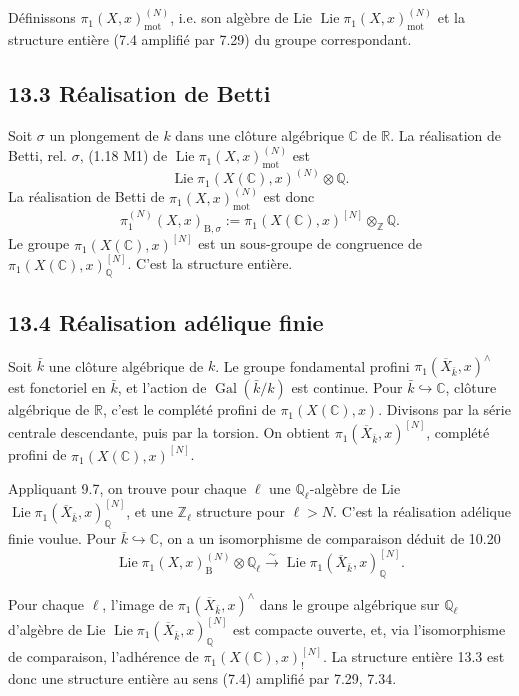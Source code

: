 \documentclass[12pt,a4paper]{article}
\theoremstyle{plain}
\theoremstyle{definition}
\theoremstyle{remark}
\DeclareMathOperator{\Lie}{Lie}
\DeclareMathOperator{\Gal}{Gal}
\newcommand{\bZ}{\mathbb{Z}}
\newcommand{\bQ}{\mathbb{Q}}
\newcommand{\bR}{\mathbb{R}}
\newcommand{\bC}{\mathbb{C}}
\newcommand{\B}{\mathrm{B}}
\newcommand{\mot}{\mathrm{mot}}
\begin{document}
Définissons $\pi_1(X,x)_{\mot}^{(N)}$, i.e. son algèbre de Lie $\Lie \pi_1(X,x)_{\mot}^{(N)}$ et la structure entière (7.4 amplifié par 7.29) du groupe correspondant.

\subsection*{13.3 Réalisation de Betti}

Soit $\sigma$ un plongement de $k$ dans une clôture algébrique $\bC$ de $\bR$. La réalisation de Betti, rel. $\sigma$, (1.18 M1) de $\Lie \pi_1(X,x)_{\mot}^{(N)}$ est
\begin{equation}\label{eq:13.3.1}
\Lie \pi_1(X(\bC), x)^{(N)} \otimes \bQ.
\end{equation}
La réalisation de Betti de $\pi_1(X,x)_{\mot}^{(N)}$ est donc
\begin{equation}\label{eq:13.3.2}
\pi_1^{(N)}(X,x)_{\B,\sigma} := \pi_1(X(\bC), x)^{[N]} \otimes_{\bZ} \bQ.
\end{equation}
Le groupe $\pi_1(X(\bC), x)^{[N]}$ est un sous-groupe de congruence de $\pi_1(X(\bC), x)^{[N]}_{\bQ}$. C'est la structure entière.

\subsection*{13.4 Réalisation adélique finie}

Soit $\bar{k}$ une clôture algébrique de $k$. Le groupe fondamental profini $\pi_1(\overline{X}_{\bar{k}}, x)^\wedge$ est fonctoriel en $\bar{k}$, et l'action de $\Gal(\bar{k}/k)$ est continue. Pour $\bar{k} \hookrightarrow \bC$, clôture algébrique de $\bR$, c'est le complété profini de $\pi_1(X(\bC), x)$. Divisons par la série centrale descendante, puis par la torsion. On obtient $\pi_1(\overline{X}_{\bar{k}}, x)^{[N]}$, complété profini de $\pi_1(X(\bC), x)^{[N]}$.

Appliquant 9.7, on trouve pour chaque $\ell$ une $\bQ_\ell$-algèbre de Lie $\Lie \pi_1(\overline{X}_{\bar{k}}, x)_{\bQ}^{[N]}$, et une $\bZ_\ell$ structure pour $\ell > N$. C'est la réalisation adélique finie voulue. Pour $\bar{k} \hookrightarrow \bC$, on a un isomorphisme de comparaison déduit de 10.20
\[
\Lie \pi_1(X,x)_{\B}^{(N)} \otimes \bQ_\ell \xrightarrow{\sim} \Lie \pi_1(\overline{X}_{\bar{k}}, x)_{\bQ}^{[N]}.
\]

Pour chaque $\ell$, l'image de $\pi_1(\overline{X}_{\bar{k}}, x)^\wedge$ dans le groupe algébrique sur $\bQ_\ell$ d'algèbre de Lie $\Lie \pi_1(\overline{X}_{\bar{k}}, x)_{\bQ}^{[N]}$ est compacte ouverte, et, via l'isomorphisme de comparaison, l'adhérence de $\pi_1(X(\bC), x)_{!}^{[N]}$. La structure entière 13.3 est donc une structure entière au sens (7.4) amplifié par 7.29, 7.34.
\end{document}
